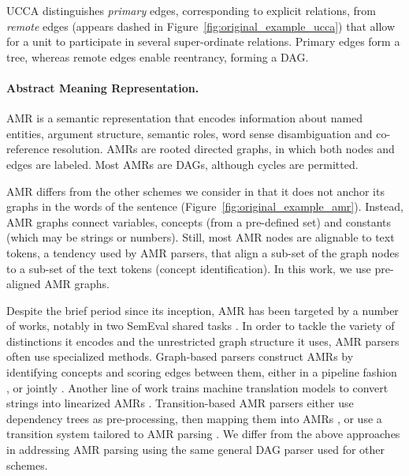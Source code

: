 \documentclass[11pt,a4paper]{article}
\begin{document}
UCCA distinguishes \textit{primary} edges, corresponding 
to explicit relations, from \textit{remote} edges (appears dashed in
Figure~\ref{fig:original_example_ucca}) that allow for a unit to participate
in several super-ordinate relations.
Primary edges form a tree, whereas remote edges enable reentrancy, forming a DAG.

\paragraph{Abstract Meaning Representation.}\label{sec:amr}

AMR \cite{banarescu2013abstract} is a semantic representation that encodes information about named entities, 
argument structure, semantic roles, word sense disambiguation and co-reference resolution.
AMRs are rooted directed graphs, in which both nodes and edges are labeled.
Most AMRs are DAGs, although cycles are permitted.

AMR differs from the other schemes we consider in that it does not anchor its graphs
in the words of the sentence (Figure~\ref{fig:original_example_amr}). Instead, AMR graphs
connect variables, concepts (from a pre-defined set) and constants (which may be strings or numbers).
Still, most AMR nodes are alignable to text tokens, a tendency used by AMR parsers,
that align a sub-set of the graph nodes to a sub-set of the text tokens (concept identification). In this work, we use pre-aligned AMR graphs.

Despite the brief period since its inception, AMR has been targeted by a number of works,
notably in two SemEval shared tasks \cite{may2016semeval,may2017semeval}.
In order to tackle the variety of distinctions it encodes and the unrestricted graph structure
it uses, AMR parsers often use specialized methods.
Graph-based parsers construct AMRs
by identifying concepts and scoring edges between them, either in a pipeline fashion
\cite{flanigan2014discriminative,artzi2015broad,pust2015parsing,foland2017abstract},
or jointly \cite{zhou2016amr}.
Another line of work %
trains machine translation models to convert strings into linearized AMRs
\cite{barzdins2016riga,Gildea2017AddressingTD,Konstas2017NeuralAS,Buys2017RobustIN}.
Transition-based AMR parsers either 
use dependency trees as pre-processing, then mapping them into AMRs
\cite{wang-xue-pradhan:2015:ACL-IJCNLP,wang2015transition,wang-EtAl:2016:SemEval,goodman2016noise},
or use a transition system tailored to AMR parsing \cite{damonte-17,D17-1130}.
We differ from the above approaches in addressing AMR parsing 
using the same general DAG parser used for other schemes.
\end{document}
